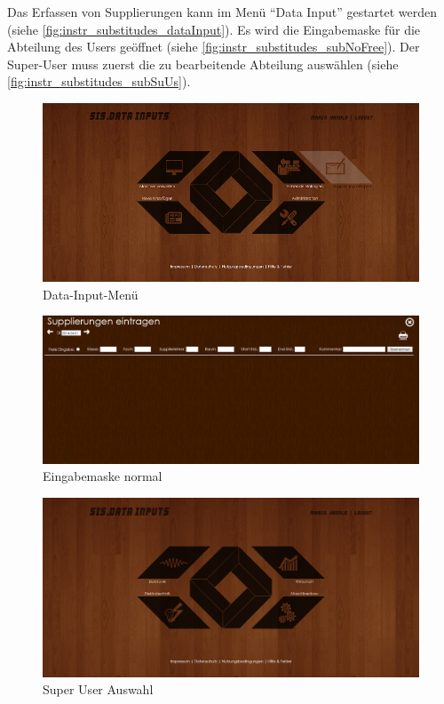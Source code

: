 Das Erfassen von Supplierungen kann im Menü \enquote{Data Input} gestartet werden (siehe \autoref{fig:instr_substitudes_dataInput}). Es wird die Eingabemaske für die Abteilung des Users geöffnet (siehe \autoref{fig:instr_substitudes_subNoFree}). Der Super-User muss zuerst die zu bearbeitende Abteilung auswählen (siehe \autoref{fig:instr_substitudes_subSuUs}).
\begin{figure}[H]
\centering
\includegraphics[keepaspectratio=true, width=14cm]{images/screenshots/data-inputs_substitudes.png}
\caption{Data-Input-Menü}
\label{fig:instr_substitudes_dataInput}
\end{figure}
\begin{figure}[H]
\centering
\includegraphics[keepaspectratio=true, width=14cm]{images/screenshots/substitudes_nofree.png}
\caption{Eingabemaske normal}
\label{fig:instr_substitudes_subNoFree}
\end{figure}
\begin{figure}[H]
\centering
\includegraphics[keepaspectratio=true, width=14cm]{images/screenshots/substitudes_sections.png}
\caption{Super User Auswahl}
\label{fig:instr_substitudes_subSuUs}
\end{figure}
